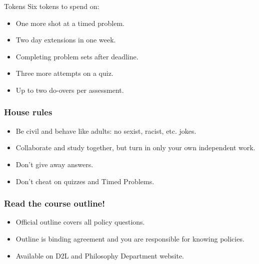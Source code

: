 \begin{frame}{Tokens}
  Six tokens to spend on:
    \begin{itemize}[<+->]
      \item One more shot at a timed problem.
      \item Two day extensions in one week.
      \item Completing problem sets after deadline.
      \item Three more attempts on a quiz.
      \item Up to two do-overs per assessment.
    \end{itemize}
\end{frame}

\begin{frame}
  \frametitle{House rules}

  \begin{itemize}[<+->]
    \item Be civil and behave like adults: no sexist, racist, etc.
    jokes.
  \item Collaborate and study together, but turn in only your own
  independent work.
  \item Don't give away answers.
  \item Don't cheat on quizzes and Timed Problems.
  \end{itemize}
\end{frame}

\begin{frame}
  \frametitle{Read the course outline!}

\begin{itemize}[<+->]
\item Official outline covers all policy questions.
\item Outline is binding agreement and you are responsible for knowing policies.
\item Available on D2L and Philosophy Department website.
\end{itemize}

\end{frame}

